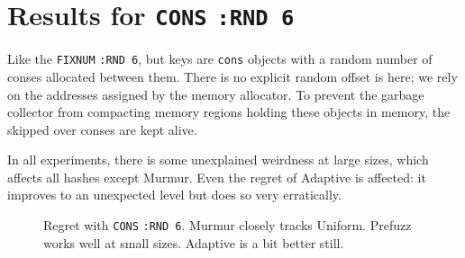 \documentclass[sigconf]{acmart}
\newcommand*\lisp[1]{\texttt{#1}}
\renewcommand{\label}[1]{%
    \gdef\sfname{sf:##1}}%
\begin{document}
\clearpage
\section{Results for \texttt{CONS} \texttt{:RND 6}}
\label{sec:results-for-cons-rnd-6}

Like the \texttt{FIXNUM} \texttt{:RND 6}, but keys are \lisp{cons} objects with a random number of conses allocated between them.
There is no explicit random offset is here; we rely on the addresses assigned by the memory allocator.
To prevent the garbage collector from compacting memory regions holding these objects in memory, the skipped over conses are kept alive.

In all experiments, there is some unexplained weirdness at large sizes, which affects all hashes except Murmur.
Even the regret of Adaptive is affected: it improves to an unexpected level but does so very erratically.

\begin{figure}[H]
\caption{Regret with \texttt{CONS} \texttt{:RND 6}.
Murmur closely tracks Uniform.
Prefuzz works well at small sizes.
Adaptive is a bit better still.}
\Description{}
\label{fig:cons-rnd-6-regret}
\end{figure}
\end{document}

